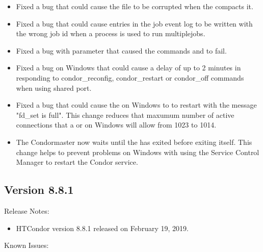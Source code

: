 \begin{itemize}
\item Fixed a bug that could cause the  file to
be corrupted when the  compacts it.

\item Fixed a bug that could cause entries in the job event log to be
written with the wrong job id when a  process is used to
run multiplejobs.

\item Fixed a bug with parameter 
that caused the  commands  and 
 to fail.

\item Fixed a bug on Windows that could cause a delay of up to 2 minutes in responding
to condor\_reconfig, condor\_restart or condor\_off commands when using shared port.

\item Fixed a bug that could cause the  on Windows to to restart with the message
"fd\_set is full".  This change reduces that maxumum number of active connections that
a  or  on Windows will allow from 1023 to 1014.

\item The Condor{master} now waits until the  has exited before exiting itself. This change
helps to prevent problems on Windows with using the Service Control Manager to restart the Condor service.


\end{itemize}

\subsection*{\label{sec:New-8-8-1}Version 8.8.1}

\noindent Release Notes:

\begin{itemize}

\item HTCondor version 8.8.1 released on February 19, 2019.

\end{itemize}

\noindent Known Issues:

